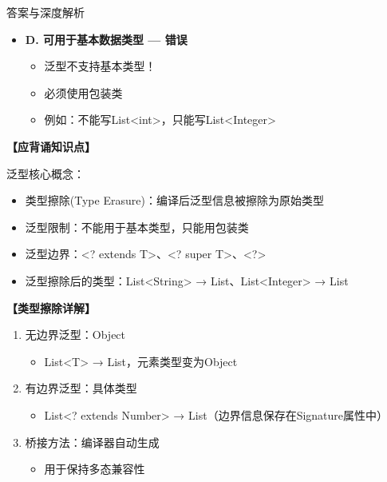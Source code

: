 \documentclass[12pt, a4paper]{ctexart}
\begin{document}
\begin{enumerate}[label=\textbf{\arabic*.}]
\begin{bluebox}{答案与深度解析}
\begin{itemize}[label={}, leftmargin=*, nosep]
\begin{itemize}[label={}, nosep]
			      \item 泛型信息在编译后被擦除
			      \item 只保留原始类型(raw type)
			      \item 这是泛型的核心机制
		      

					  \end{itemize}
		      \item \textbf{D. 可用于基本数据类型 — 错误}
					  \begin{itemize}[label={}, nosep]
		      
			      \item 泛型不支持基本类型！
			      \item 必须使用包装类
			      \item 例如：不能写List<int>，只能写List<Integer>
		      

		      
					  \end{itemize}
					  \end{itemize}
\textbf{【应背诵知识点】}

		      泛型核心概念：
		      \begin{itemize}[label={}, leftmargin=*, nosep]
			      \item 类型擦除(Type Erasure)：编译后泛型信息被擦除为原始类型
			      \item 泛型限制：不能用于基本类型，只能用包装类
			      \item 泛型边界：<? extends T>、<? super T>、<?>
			      \item 泛型擦除后的类型：List<String> → List、List<Integer> → List
		      \end{itemize}

		      \textbf{【类型擦除详解】}

		      \begin{enumerate}[label={}]
			      \item 无边界泛型：Object
			            \begin{itemize}[label={}, leftmargin=*, nosep]
				            \item List<T> → List，元素类型变为Object
			            \end{itemize}
			      \item 有边界泛型：具体类型
			            \begin{itemize}[label={}, leftmargin=*, nosep]
				            \item List<? extends Number> → List（边界信息保存在Signature属性中）
			            \end{itemize}
			      \item 桥接方法：编译器自动生成
			            \begin{itemize}[label={}, leftmargin=*, nosep]
				            \item 用于保持多态兼容性
			            \end{itemize}
		      \end{enumerate}


\end{bluebox}
\end{enumerate}
\end{document}

